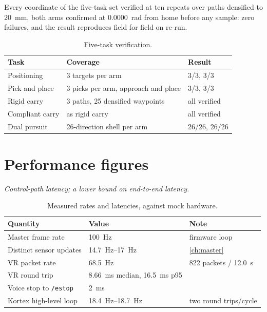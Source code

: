 Every coordinate of the five-task set verified at ten repeats over paths
densified to \SI{20}{\milli\metre}, both arms confirmed at
\SI{0.0000}{\radian} from home before any sample: zero failures, and the
result reproduces field for field on re-run.

\begin{table}[htbp]
  \centering
  \caption{Five-task verification.}
  \label{tab:final5}
  \begin{tabular}{@{}lll@{}}
    \toprule
    Task & Coverage & Result \\
    \midrule
    Positioning       & 3 targets per arm                    & 3/3, 3/3 \\
    Pick and place    & 3 picks per arm, approach and place  & 3/3, 3/3 \\
    Rigid carry       & 3 paths, 25 densified waypoints      & all verified \\
    Compliant carry   & as rigid carry                       & all verified \\
    Dual pursuit      & 26-direction shell per arm            & 26/26, 26/26 \\
    \bottomrule
  \end{tabular}
\end{table}

\section{Performance figures}

\emph{Control-path latency; a lower bound on end-to-end latency.}

\begin{table}[htbp]
  \centering
  \small
  \caption{Measured rates and latencies, against mock hardware.}
  \label{tab:perf}
  \begin{tabular}{@{}lll@{}}
    \toprule
    Quantity & Value & Note \\
    \midrule
    Master frame rate       & \SI{100}{\hertz} & firmware loop \\
    Distinct sensor updates & \SIrange{14.7}{17}{\hertz} & \cref{ch:master} \\
    VR packet rate          & \SI{68.5}{\hertz} & 822 packets / \SI{12.0}{\second} \\
    VR round trip           & \SI{8.66}{\milli\second} median, \SI{16.5}{\milli\second} p95 & \\
    Voice stop to \texttt{/estop} & \SI{2}{\milli\second} & \\
    Kortex high-level loop  & \SIrange{18.4}{18.7}{\hertz} & two round trips/cycle \\
    \bottomrule
  \end{tabular}
\end{table}

